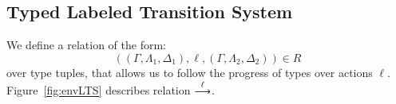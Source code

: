 %
%

\subsection{Typed Labeled Transition System}



We define a relation of the form:
%
\[
	((\Gamma, \Lambda_1, \Delta_1), \ell, (\Gamma, \Lambda_2, \Delta_2)) \in R
\]
%
\noi over type tuples, that allows us to follow the progress of types over actions $\ell$.
Figure~\ref{fig:envLTS} describes relation $\stackrel{\ell}{\longrightarrow}$.

